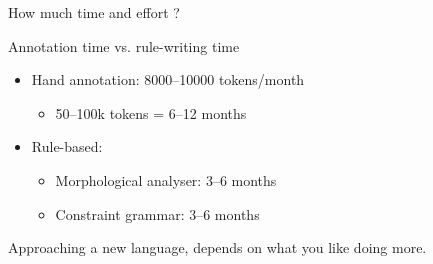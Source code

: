 \documentclass{beamer}
\begin{document}


\begin{frame}{How much time and effort ?}

\begin{center}
 Annotation time vs. rule-writing time
\end{center}

\begin{itemize}
   \item Hand annotation: 8000--10000 tokens/month 
   \begin{itemize}
     \item 50--100k tokens = 6--12 months
   \end{itemize}
   \item Rule-based:
   \begin{itemize}
    \item  Morphological analyser: 3--6 months
    \item  Constraint grammar: 3--6 months
   \end{itemize}
\end{itemize}

Approaching a new language, depends on what you like doing more.



\end{frame}

\end{document}
